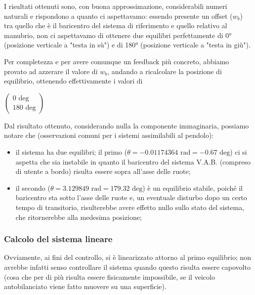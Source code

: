 I risultati ottenuti sono, con buona approssimazione, considerabili numeri naturali e rispondono a quanto ci aspettavamo: essendo presente un offset ($w_b$) tra quello che è il baricentro del sistema di riferimento e quello relativo al manubrio, non ci aspettavamo di ottenere due equilibri perfettamente di 0° (posizione verticale a "testa in sù") e di 180° (posizione verticale a "testa in giù").

Per completezza e per avere comunque un feedback più concreto, abbiamo provato ad azzerare il valore di $w_b$, andando a ricalcolare la posizione di equilibrio, ottenendo effettivamente i valori di
\begin{center}
	$\left(\begin{array}{c}
	0 \text{ deg}\\
	180 \text{ deg}
	\end{array}\right)$
\end{center}

Dal risultato ottenuto, considerando nulla la componente immaginaria, possiamo notare che (osservazioni comuni per i sistemi assimilabili al pendolo):

\begin{itemize}
	\item il sistema ha due equilibri; il primo ($\theta = -0.01174364 \text{ rad} = -0.67 \text{ deg}$) ci si aspetta che sia instabile in quanto il baricentro del sistema V.A.B. (compreso di utente a bordo) risulta essere sopra all'asse delle ruote;
	\item il secondo ($\theta = 3.129849 \text{ rad} = 179.32 \text{ deg}$) è un equilibrio stabile, poiché il baricentro sta sotto l'asse delle ruote e, un eventuale disturbo dopo un certo tempo di transitorio, risulterebbe avere effetto nullo sullo stato del sistema, che ritornerebbe alla medesima posizione;
\end{itemize}

\subsubsection{Calcolo del sistema lineare}
Ovviamente, ai fini del controllo, si è linearizzato attorno al primo equilibrio; non avrebbe infatti senso controllare il sistema quando questo risulta essere capovolto (cosa che per di più risulta essere fisicamente impossibile, se il veicolo autobilanciato viene fatto muovere su una superficie).

